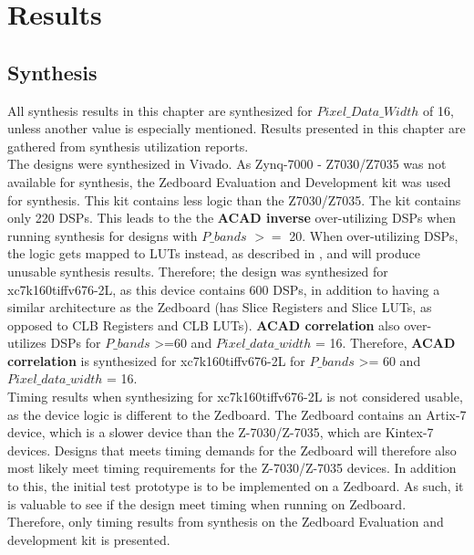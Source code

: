 \newpage
\chapter{Results}
\label{sec:results}
\section{Synthesis}
\label{sec:synthesis_results}
All synthesis results in this chapter are synthesized for $Pixel\_Data\_Width$ of 16, unless another value is 
especially mentioned. Results presented in this chapter are gathered from synthesis utilization reports.\\

The designs were synthesized in Vivado. As Zynq-7000 - Z7030/Z7035 was not available for synthesis, the Zedboard Evaluation and Development kit was used for synthesis. This kit contains less logic than the Z7030/Z7035. The kit contains only 220 DSPs. This leads to the the \textbf{ACAD inverse} over-utilizing DSPs when running synthesis for designs with $P\_bands$ $>=$ 20. When over-utilizing DSPs, the logic gets mapped to LUTs instead, as described in \cite{cite:dsp_overutilizing}, and will produce unusable synthesis results. Therefore; the design was synthesized for xc7k160tiffv676-2L, as this device contains 600 DSPs, in addition to having a similar architecture as the Zedboard (has Slice Registers and Slice LUTs, as opposed to CLB Registers and CLB LUTs). \textbf{ACAD correlation} also over-utilizes DSPs for $P\_bands$ >=60 and $Pixel\_data\_width$ = 16. Therefore, \textbf{ACAD correlation} is synthesized for xc7k160tiffv676-2L for $P\_bands$ >= 60 and $Pixel\_data\_width$ = 16.\\

Timing results when synthesizing for xc7k160tiffv676-2L is not considered usable, as the device logic is different to the Zedboard. The Zedboard contains an Artix-7 device, which is a slower device than the Z-7030/Z-7035, which are Kintex-7 devices. Designs that meets timing demands for the Zedboard will therefore also most likely meet timing requirements for the Z-7030/Z-7035 devices. In addition to this, the initial test prototype is to be implemented on a Zedboard. As such, it is valuable to see if the design meet timing when running on Zedboard. Therefore, only timing results from synthesis on the Zedboard Evaluation and development kit is presented. 



